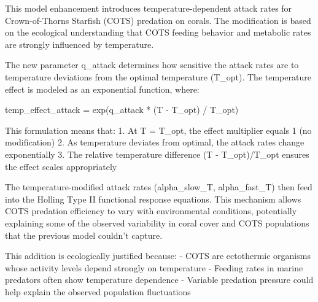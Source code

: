 This model enhancement introduces temperature-dependent attack rates for Crown-of-Thorns Starfish (COTS) predation on corals. The modification is based on the ecological understanding that COTS feeding behavior and metabolic rates are strongly influenced by temperature.

The new parameter q_attack determines how sensitive the attack rates are to temperature deviations from the optimal temperature (T_opt). The temperature effect is modeled as an exponential function, where:

temp_effect_attack = exp(q_attack * (T - T_opt) / T_opt)

This formulation means that:
1. At T = T_opt, the effect multiplier equals 1 (no modification)
2. As temperature deviates from optimal, the attack rates change exponentially
3. The relative temperature difference (T - T_opt)/T_opt ensures the effect scales appropriately

The temperature-modified attack rates (alpha_slow_T, alpha_fast_T) then feed into the Holling Type II functional response equations. This mechanism allows COTS predation efficiency to vary with environmental conditions, potentially explaining some of the observed variability in coral cover and COTS populations that the previous model couldn't capture.

This addition is ecologically justified because:
- COTS are ectothermic organisms whose activity levels depend strongly on temperature
- Feeding rates in marine predators often show temperature dependence
- Variable predation pressure could help explain the observed population fluctuations
